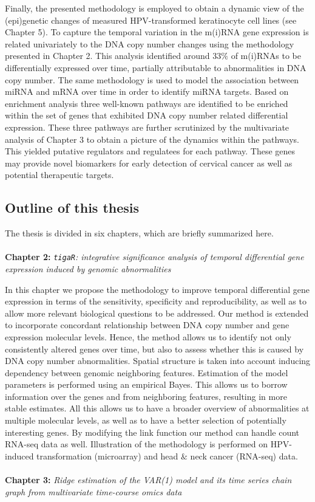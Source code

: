 Finally, the presented methodology is employed to obtain a dynamic view of the (epi)genetic changes of measured HPV-transformed keratinocyte cell lines (see Chapter 5). To capture the temporal variation in the m(i)RNA gene expression is related univariately to the DNA copy number changes using the methodology presented in Chapter 2.  This analysis identified around 33$\%$ of m(i)RNAs to be differentially expressed over time, partially attributable to abnormalities in DNA copy number. The same methodology is used to model the association between miRNA and mRNA over time in order
to identify miRNA targets. Based on enrichment analysis three well-known pathways are identified to be enriched within the set of genes that exhibited DNA copy number related differential expression. These three pathways are further scrutinized by the multivariate analysis of Chapter 3 to obtain a 
picture of the dynamics within the pathways. This yielded putative regulators and regulatees for each
pathway. These genes may provide novel biomarkers for early detection of cervical
cancer as well as potential therapeutic targets.


\newpage
\subsection{Outline of this thesis}

The thesis is divided in six chapters, which are briefly summarized here.
\\
\\
\textbf{Chapter 2:} \textit{ {\tt{tigaR}}: integrative significance analysis of temporal differential gene expression induced by genomic abnormalities}

In this chapter we propose the methodology to improve temporal differential gene expression in terms of the sensitivity, specificity and reproducibility, as well as to allow more relevant biological questions to be addressed. Our method is extended to incorporate concordant relationship between DNA copy number and gene expression molecular levels. Hence, the method allows us to identify not only consistently altered genes over time, but also to assess whether this is caused by DNA copy number abnormalities. Spatial structure is taken into account inducing dependency between genomic neighboring features. Estimation of the model parameters is performed using an empirical Bayes. This allows us to borrow information over the genes and from neighboring features, resulting in more stable estimates. All this allows us to have a broader overview of abnormalities at multiple molecular levels, as well as to have a better selection of potentially interesting genes. By modifying the link function our method can handle count RNA-seq data as well. Illustration of the methodology is performed on HPV-induced transformation (microarray) and head $\&$ neck cancer (RNA-seq) data. 
\\
\\
\textbf{Chapter 3:} \textit{Ridge estimation of the VAR(1) model and its time series chain graph from multivariate time-course omics data}


